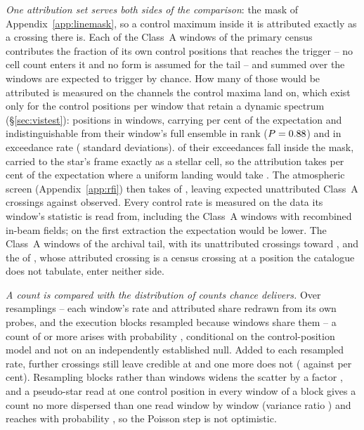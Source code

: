 \emph{One attribution set serves both sides of the comparison}: the mask of
Appendix~\ref{app:linemask}, so a control maximum inside it is attributed
exactly as a crossing there is. Each of the \CeNWin{} Class~A windows of the
primary census contributes the fraction of its own \NCtrl{} control positions
that reaches the trigger -- no cell count enters it and no form is assumed
for the tail -- and summed over the windows \CeExpTrig{} are expected to
trigger by chance. How many of those would be attributed is measured on the
channels the control maxima land on, which exist only for the \RcNRetCtrl{}
control positions per window that retain a dynamic spectrum
(\S\ref{sec:vistest}): \CeNExcPos{} positions in \CeNExcWin{} windows,
carrying \CeExcCovPct{} per cent of the expectation and indistinguishable from
their window's full ensemble in rank ($P=0.88$) and in exceedance rate
(\CeRetZ{} standard deviations). \CeNExcAttr{} of their \CeNExc{} exceedances
fall inside the mask, carried to the star's frame exactly as a stellar cell,
so the attribution takes \CeMaskPct{} per cent of the expectation where a
uniform landing would take \CeUnifPct. The atmospheric screen
(Appendix~\ref{app:rfi}) then takes \CeTlCtrlCut{} of \CeTlCtrlSurv, leaving
\CeExp{} expected unattributed Class~A crossings against \CeObs{} observed.
Every control rate is measured on the data its window's statistic is read
from, including the \CeNRepWinA{} Class~A windows with recombined in-beam
fields; on the first extraction the expectation would be \CeRepDExp{} lower.
The \CeNWinTail{} Class~A windows of the archival tail, with its
\CeNTailCrossWord{} unattributed crossings toward \CeTailStar, and the
\CeNWinComp{} of \OmXStar, whose attributed crossing is a census crossing at a
position the catalogue does not tabulate, enter neither side.

\emph{A count is compared with the distribution of counts chance delivers.}
Over \CeNBoot{} resamplings -- each window's rate and attributed share redrawn
from its own probes, and the execution blocks resampled because windows share
them -- a count of \CeObs{} or more arises with probability \CeProbNull{},
conditional on the control-position model and not on an independently
established null. Added to each resampled rate, \CeAddLim{} further crossings
still leave \CeObs{} credible at \CeProbAtLim{} and one more does not
(\CeProbAboveLim{} against \CeAlphaPct{} per cent). Resampling blocks rather
than windows widens the scatter by a factor \BgBlockSdRatio, and a pseudo-star
read at one control position in every window of a block gives a count no more
dispersed than one read window by window (variance ratio \BgDisp) and reaches
\CeObs{} with probability \BgPseudoP, so the Poisson step is not optimistic.

